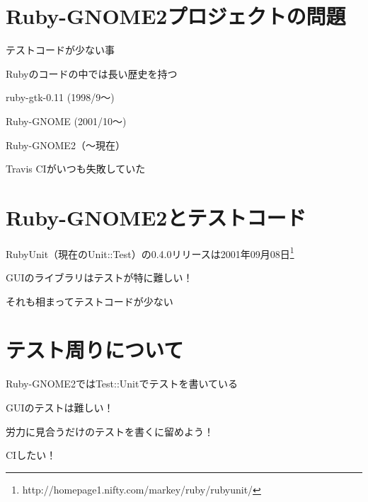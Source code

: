 \section{Ruby-GNOME2プロジェクトの問題}

\begin{frame}
\begin{itemize}
{\Large
\item{} テストコードが少ない事
\item{} Rubyのコードの中では長い歴史を持つ

ruby-gtk-0.11 (1998/9〜)

Ruby-GNOME (2001/10〜)

Ruby-GNOME2（〜現在）
}
{\huge
\item{} Travis CIがいつも失敗していた
}
\end{itemize}
\end{frame}

\section{Ruby-GNOME2とテストコード}

\begin{frame}
\begin{itemize}
{\huge
\item RubyUnit（現在のUnit::Test）の0.4.0リリースは2001年09月08日\footnote{http://homepage1.nifty.com/markey/ruby/rubyunit/}
\item GUIのライブラリはテストが特に難しい！
\item それも相まってテストコードが少ない
}
\end{itemize}
\end{frame}

\section{テスト周りについて}
\begin{frame}
\begin{itemize}
{\huge
\item{} Ruby-GNOME2ではTest::Unitでテストを書いている
\item{} GUIのテストは難しい！
\item{} 労力に見合うだけのテストを書くに留めよう！
\item{} CIしたい！
}
\end{itemize}
\end{frame}
